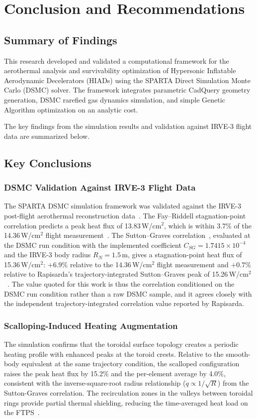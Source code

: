 \chapter{Conclusion and Recommendations}

\section{Summary of Findings}
This research developed and validated a computational framework for the aerothermal analysis and survivability optimization of Hypersonic Inflatable Aerodynamic Decelerators (HIADs) using the SPARTA Direct Simulation Monte Carlo (DSMC) solver. The framework integrates parametric CadQuery geometry generation, DSMC rarefied gas dynamics simulation, and simple Genetic Algorithm optimization on an analytic cost.

The key findings from the simulation results and validation against IRVE-3 flight data are summarized below.

\section{Key Conclusions}

\subsection{DSMC Validation Against IRVE-3 Flight Data}
The SPARTA DSMC simulation framework was validated against the IRVE-3 post-flight aerothermal reconstruction data~\cite{lau2013irve3}. The Fay--Riddell stagnation-point correlation predicts a peak heat flux of 13.83\,W/cm$^2$, which is within 3.7\% of the 14.36\,W/cm$^2$ flight measurement~\cite{rapisarda2023mdao}. The Sutton--Graves correlation~\cite{sutton1971gravesh}, evaluated at the DSMC run condition with the implemented coefficient $C_{SG} = 1.7415 \times 10^{-4}$ and the IRVE-3 body radius $R_N = 1.5$\,m, gives a stagnation-point heat flux of 15.36\,W/cm$^2$: $+6.9\%$ relative to the 14.36\,W/cm$^2$ flight measurement and $+0.7\%$ relative to Rapisarda's trajectory-integrated Sutton--Graves peak of 15.26\,W/cm$^2$~\cite{rapisarda2023mdao}. The value quoted for this work is thus the correlation conditioned on the DSMC run condition rather than a raw DSMC sample, and it agrees closely with the independent trajectory-integrated correlation value reported by Rapisarda.

\subsection{Scalloping-Induced Heating Augmentation}
The simulation confirms that the toroidal surface topology creates a periodic heating profile with enhanced peaks at the toroid crests. Relative to the smooth-body equivalent at the same trajectory condition, the scalloped configuration raises the peak heat flux by 15.2\% and the per-element average by 4.0\%, consistent with the inverse-square-root radius relationship ($\dot{q} \propto 1/\sqrt{R}$) from the Sutton-Graves correlation. The recirculation zones in the valleys between toroidal rings provide partial thermal shielding, reducing the time-averaged heat load on the FTPS~\cite{hollis2018surface}.

